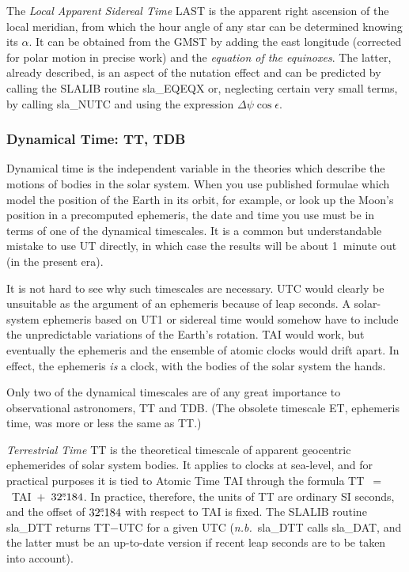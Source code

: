 \documentclass[11pt,twoside]{article}
\newcommand{\tseci}[1]   {$#1$\mbox{$^{\rm s}$}}
\newcommand{\tsec}[2]    {\tseci{#1}$\hspace{-0.3em}.#2$}
\renewcommand{\tsec}[2] {$#1^{\rm s}\hspace{-0.3em}.#2$}
\begin{document}
The {\it Local Apparent Sidereal Time}\/ LAST is the apparent right
ascension of the local meridian, from which the hour angle of any
star can be determined knowing its $\alpha$.  It can be obtained from the
GMST by adding the east longitude (corrected for polar motion
in precise work) and the {\it equation of the equinoxes}.  The
latter, already described, is an aspect of the nutation effect
and can be predicted by calling the SLALIB routine
sla\_EQEQX
or, neglecting certain very small terms, by calling
sla\_NUTC
and using the expression $\Delta\psi\cos\epsilon$.

\subsubsection{Dynamical Time: TT, TDB}
Dynamical time is the independent variable in the theories
which describe the motions of bodies in the solar system.  When
you use published formulae which model the position of the
Earth in its orbit, for example, or look up
the Moon's position in a precomputed ephemeris, the date and time
you use must be in terms of one of the dynamical timescales.  It
is a common but understandable mistake to use UT directly, in which
case the results will be about 1~minute out (in the present
era).

It is not hard to see why such timescales are necessary.
UTC would clearly be unsuitable as the argument of an
ephemeris because of leap seconds.
A solar-system ephemeris based on UT1 or sidereal time would somehow
have to include the unpredictable variations of the Earth's rotation.
TAI would work, but eventually
the ephemeris and the ensemble of atomic clocks would drift apart.
In effect, the ephemeris {\it is}\/ a clock, with the bodies of
the solar system the hands.

Only two of the dynamical timescales are of any great importance to
observational astronomers, TT and TDB.  (The obsolete
timescale ET, ephemeris time, was more or less the same as TT.)

{\it Terrestrial Time}\/ TT is
the theoretical timescale of apparent geocentric ephemerides of solar
system bodies.  It applies to clocks at sea-level, and for practical purposes
it is tied to
Atomic Time TAI through the formula TT~$=$~TAI~$+$~\tsec{32}{184}.
In practice, therefore, the units of TT are ordinary SI seconds, and
the offset of \tsec{32}{184} with respect to TAI is fixed.
The SLALIB routine
sla\_DTT
returns TT$-$UTC for a given UTC
({\it n.b.}\  sla\_DTT
calls
sla\_DAT,
and the latter must be an up-to-date version if recent leap seconds are
to be taken into account).
\end{document}

